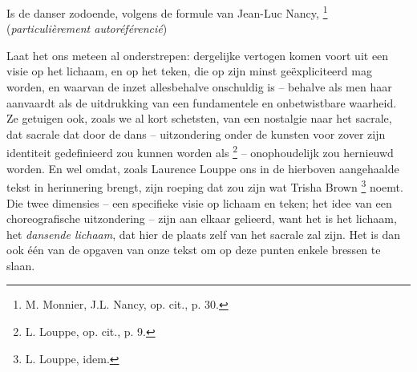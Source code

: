 {Is de danser zodoende, volgens de formule van Jean{}-Luc Nancy,  \footnote{M. Monnier, J.L. Nancy, op. cit., p. 30.} ({\em particuli\`erement autor\'ef\'erenci\'e}) 

Laat het ons meteen al onderstrepen: dergelijke vertogen komen voort uit een visie op het lichaam, en op het teken, die op zijn minst ge\"expliciteerd mag worden, en waarvan de inzet allesbehalve onschuldig is {--} behalve als men haar aanvaardt als de uitdrukking van een fundamentele en onbetwistbare waarheid. Ze getuigen ook, zoals we al kort schetsten, van een nostalgie naar het sacrale, dat sacrale dat door de dans {--} uitzondering onder de kunsten voor zover zijn identiteit gedefinieerd zou kunnen worden als  \footnote{L. Louppe, op. cit., p. 9.} {--} onophoudelijk zou hernieuwd worden. En wel omdat, zoals Laurence Louppe ons in de hierboven aangehaalde tekst in herinnering brengt, zijn roeping dat zou zijn wat Trisha Brown  \footnote{L. Louppe, idem.} noemt. Die twee dimensies {--} een specifieke visie op lichaam en teken; het idee van een choreografische uitzondering {--} zijn aan elkaar gelieerd, want het is het lichaam, het {\em dansende lichaam}, dat hier de plaats zelf van het sacrale zal zijn. Het is dan ook \'e\'en van de opgaven van onze tekst om op deze punten enkele bressen te slaan.

}
